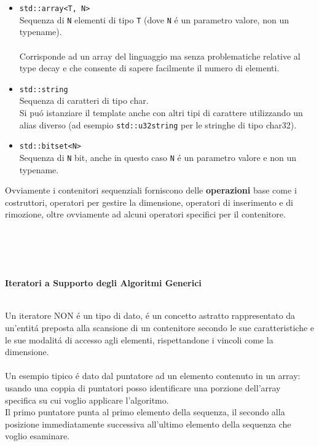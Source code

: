 \documentclass{article}
\begin{document}
\begin{itemize}
\item \texttt{\textcolor{blu}{std::array<T, N>}} \\ Sequenza di \texttt{N} elementi di tipo \texttt{T} (dove \texttt{N} \'e un parametro valore, non un typename). \\ \\Corrisponde ad un array del linguaggio ma senza problematiche relative al type decay e che consente di sapere facilmente il numero di elementi.\\
\item \texttt{\textcolor{blu}{std::string}} \\ Sequenza di caratteri di tipo char. \\ Si pu\'o istanziare il template anche con altri tipi di carattere utilizzando un alias diverso (ad esempio \texttt{std::u32string} per le stringhe di tipo char32).\\
\item \texttt{\textcolor{blu}{std::bitset<N>}} \\ Sequenza di \texttt{N} bit, anche in questo caso \texttt{N} \'e un parametro valore e non un typename. \\
\end{itemize}
Ovviamente i contenitori sequenziali forniscono delle \textbf{operazioni} base come i costruttori, operatori per gestire la dimensione, operatori di inserimento e di rimozione, oltre ovviamente ad alcuni operatori specifici per il contenitore.
\\ \\ \\ \\ \\
\begin{large}\textbf{\textcolor{blu}{Iteratori a Supporto degli Algoritmi Generici}} \\ \\ \end{large}
Un iteratore NON \'e un tipo di dato, \'e un concetto astratto rappresentato da un'entit\'a preposta alla scansione di un contenitore secondo le sue caratteristiche e le sue modalit\'a di accesso agli elementi, rispettandone i vincoli come la dimensione.\\ \\Un esempio tipico \'e dato dal puntatore ad un elemento contenuto in un array: usando una coppia di puntatori posso identificare una porzione dell'array specifica su cui voglio applicare l'algoritmo.\\Il primo puntatore punta al primo elemento della sequenza, il secondo alla posizione immediatamente successiva all'ultimo elemento della sequenza che voglio esaminare.\\ \\
\end{document}
